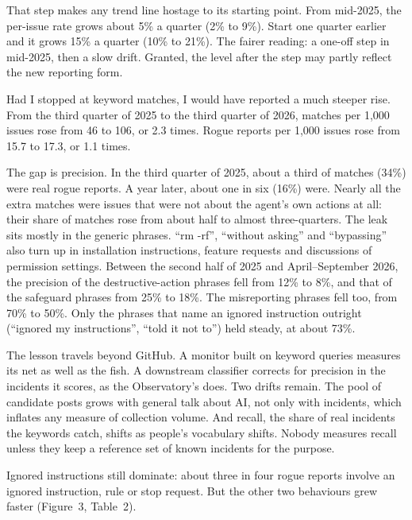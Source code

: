 That step makes any trend line hostage to its starting point. From mid-2025, the per-issue rate grows about 5\% a quarter (2\% to 9\%). Start one quarter earlier and it grows 15\% a quarter (10\% to 21\%). The fairer reading: a one-off step in mid-2025, then a slow drift. Granted, the level after the step may partly reflect the new reporting form.


Had I stopped at keyword matches, I would have reported a much steeper rise. From the third quarter of 2025 to the third quarter of 2026, matches per 1,000 issues rose from 46 to 106, or 2.3 times. Rogue reports per 1,000 issues rose from 15.7 to 17.3, or 1.1 times.

The gap is precision. In the third quarter of 2025, about a third of matches (34\%) were real rogue reports. A year later, about one in six (16\%) were. Nearly all the extra matches were issues that were not about the agent’s own actions at all: their share of matches rose from about half to almost three-quarters. The leak sits mostly in the generic phrases. “rm -rf”, “without asking” and “bypassing” also turn up in installation instructions, feature requests and discussions of permission settings. Between the second half of 2025 and April–September 2026, the precision of the destructive-action phrases fell from 12\% to 8\%, and that of the safeguard phrases from 25\% to 18\%. The misreporting phrases fell too, from 70\% to 50\%. Only the phrases that name an ignored instruction outright (“ignored my instructions”, “told it not to”) held steady, at about 73\%.

The lesson travels beyond GitHub. A monitor built on keyword queries measures its net as well as the fish. A downstream classifier corrects for precision in the incidents it scores, as the Observatory’s does. Two drifts remain. The pool of candidate posts grows with general talk about AI, not only with incidents, which inflates any measure of collection volume. And recall, the share of real incidents the keywords catch, shifts as people’s vocabulary shifts. Nobody measures recall unless they keep a reference set of known incidents for the purpose.


Ignored instructions still dominate: about three in four rogue reports involve an ignored instruction, rule or stop request. But the other two behaviours grew faster (Figure~3, Table~2).

